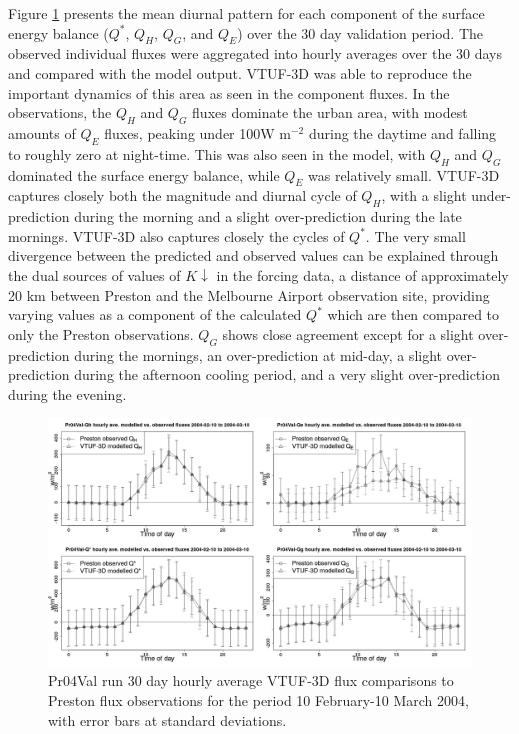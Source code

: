 \documentclass[final,3p,times,authoryear]{elsarticle}
\begin{document}
Figure \ref{fig:Preston30Day4} presents the mean diurnal pattern for each component of the surface energy balance ($Q^{*}$, $Q_{H}$, $Q_{G}$, and $Q_{E}$)  over the 30 day validation period. The observed individual fluxes were aggregated into hourly averages over the 30 days and compared with the model output. VTUF-3D was able to reproduce the important dynamics of this area as seen in the component fluxes. In the observations, the $Q_{H}$ and $Q_{G}$ fluxes dominate the urban area, with modest amounts of $Q_{E}$ fluxes, peaking under 100W m$^{-2}$ during the daytime and falling to roughly zero at night-time. This was also seen in the model, with $Q_{H}$ and $Q_{G}$ dominated the surface energy balance, while $Q_{E}$ was relatively small. VTUF-3D captures closely both the magnitude and diurnal cycle of $Q_{H}$, with a slight under-prediction during the morning and a slight over-prediction during the late mornings. VTUF-3D also captures closely the cycles of $Q^{*}$. The very small divergence between the predicted and observed values can be explained through the dual sources of values of $K\downarrow$ in the forcing data, a distance of approximately 20 km between Preston and the Melbourne Airport observation site, providing varying values as a component of the calculated $Q^{*}$ which are then compared to only the Preston observations. $Q_{G}$ shows close agreement except for a slight over-prediction during the mornings, an over-prediction at mid-day, a slight over-prediction during the afternoon cooling period, and a very slight over-prediction during the evening. 


\begin{figure}[!htbp] 
\includegraphics[trim = 0mm 0mm 0mm 0mm, clip, scale=0.30]{images/Pr04Val-EnergyBalanceOverallAve4Plots_.png}
\caption{Pr04Val run 30 day hourly average VTUF-3D flux comparisons to Preston flux observations for the period 10 February-10 March 2004, with error bars at standard deviations. \label{fig:Preston30Day4} }     
\end{figure}
\end{document}
